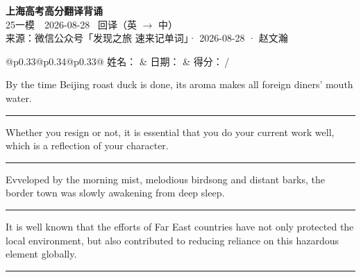 \documentclass[11pt,a4paper]{article}
\newcommand{\num}[1]{\makebox[1.9em][r]{#1.}\hspace{0.3em}}
\newcommand{\wline}{\noindent\rule{\linewidth}{0.4pt}}
\begin{document}
\pagestyle{plain}
\begin{center}
{\LARGE\bfseries 上海高考高分翻译背诵 }\\[0.25em]
{\large 25一模　2026-08-28 \quad\ 回译（英 $\to$ 中）}\\[0.35em]
{\footnotesize 来源：微信公众号「发现之旅 速来记单词」· 2026-08-28 · 赵文瀚}
\end{center}

\vspace{0.4em}
\noindent\begin{tabular}{@{}p{0.33\textwidth}@{}p{0.34\textwidth}@{}p{0.33\textwidth}@{}}
姓名：\underline{\hspace{2.0cm}} & 日期：\underline{\hspace{2.0cm}} & 得分：\underline{\hspace{1.4cm}}\,/ \\
\end{tabular}

\vspace{0.5em}

\vspace{0.8em}
\num{1}By the time Beijing roast duck is done, its aroma makes all foreign diners’ mouth water.

\vspace{0.25em}

\wline

\num{2}Whether you resign or not, it is essential that you do your current work well, which is a reflection of your character.

\vspace{0.25em}

\wline

\num{3}Evveloped by the morning mist, melodious birdsong and distant barks, the border town was slowly awakening from deep sleep.

\vspace{0.25em}

\wline

\num{4}It is well known that the efforts of Far East countries have not only protected the local environment, but also contributed to reducing reliance on this hazardous element globally.

\vspace{0.25em}

\wline
\end{document}
